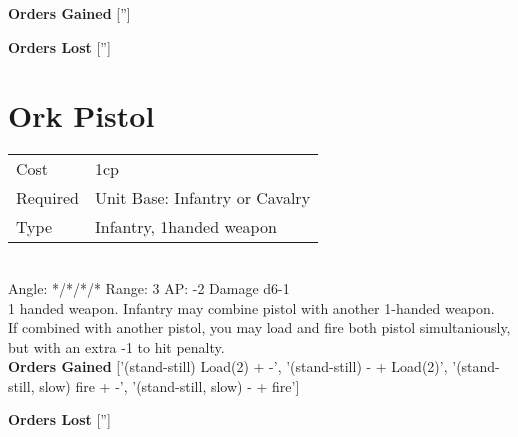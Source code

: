 {\bf Orders Gained}
['']

{\bf Orders Lost}
['']
\section{ Ork Pistol }

\begin{tabular}{ll}
    Cost & 1cp \\
    Required & Unit Base: Infantry or Cavalry\\
    Type & Infantry, 1handed weapon\\
\end{tabular}
\ \\
\indent Angle: */*/*/* Range: 3  AP: -2 Damage d6-1 \\
1 handed weapon. Infantry may combine pistol with another 1-handed weapon. \\ If combined with another pistol, you may load and fire both pistol simultaniously, but with an extra -1 to hit penalty.
\ \\

{\bf Orders Gained}
['(stand-still) Load(2) + -', '(stand-still) - + Load(2)', '(stand-still, slow) fire + -', '(stand-still, slow) - + fire']

{\bf Orders Lost}
['']
